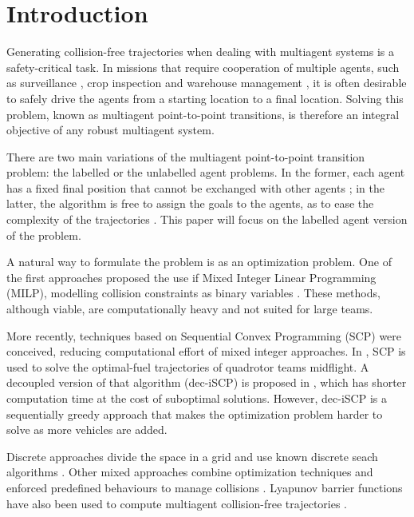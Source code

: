 \section{Introduction}
\label{sec:introduction}
Generating collision-free trajectories when dealing with multiagent systems is a safety-critical task. In missions that require cooperation of multiple agents, such as surveillance \cite{vallejo2009multi}, crop inspection \cite{carbone2018swarm} and warehouse management \cite{guizzo2008three}, it is often desirable to safely drive the agents from a starting location to a final location. Solving this problem, known as multiagent point-to-point transitions, is therefore an integral objective of any robust multiagent system.

There are two main variations of the multiagent point-to-point transition problem: the labelled or the unlabelled agent problems. In the former, each agent has a fixed final position that cannot be exchanged with other agents \cite{schouwenaars2001mixed, augugliaro2012generation}; in the latter, the algorithm is free to assign the goals to the agents, as to ease the complexity of the trajectories \cite{turpin2012decentralized}. This paper will focus on the labelled agent version of the problem. 

A natural way to formulate the problem is as an optimization problem. One of the first approaches proposed the use if Mixed Integer Linear Programming (MILP), modelling collision constraints as binary variables \cite{schouwenaars2001mixed}. These methods, although viable, are computationally heavy and not suited for large teams.

More recently, techniques based on Sequential Convex Programming (SCP) \cite{boyd2008sequential} were conceived, reducing computational effort of mixed integer approaches. In \cite{augugliaro2012generation}, SCP is used to solve the optimal-fuel trajectories of quadrotor teams midflight. A decoupled version of that algorithm (dec-iSCP) is proposed in \cite{chen2015decoupled}, which has shorter computation time at the cost of suboptimal solutions. However, dec-iSCP is a sequentially greedy approach that makes the optimization problem harder to solve as more vehicles are added.

Discrete approaches divide the space in a grid and use known discrete seach algorithms \cite{preiss}. Other mixed approaches combine optimization techniques and enforced predefined behaviours to manage collisions \cite{tang2018complete}. Lyapunov barrier functions have also been used to compute multiagent collision-free trajectories \cite{wang2017safety}.

